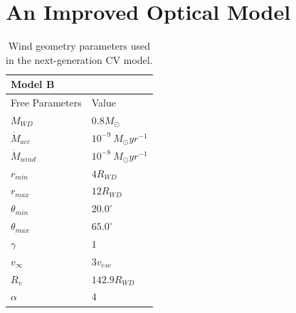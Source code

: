 \documentclass[preprint, a4paper, 11pt]{aastex}
\begin{document}
{%


%
%

\section{An Improved Optical Model }

\begin{table}
\centering
\begin{tabular}{p{3cm}p{4cm}}
Model B \\
\hline Free Parameters 	&	 Value \\ 
\hline \hline 
$M_{WD}$ 	 &	 $0.8 M_{\odot}$ \\ 
$\dot{M}_{acc}$ 	 &	 $10^{-9}~M_{\odot}yr^{-1}$\\ 
$\dot{M}_{wind}$  &	$10^{-8}~M_{\odot}yr^{-1}$\\ 
$r_{min}$ 	&	 $4 R_{WD}$\\ 
$r_{max}$ 	&	 $12 R_{WD}$ \\ 
$\theta_{min}$ 	&	 $20.0^{\circ}$ \\ 
$\theta_{max}$ 	&	 $65.0^{\circ}$ \\ 
$\gamma$ 	&	 $1$ \\ 
$v_{\infty}$ 	&	 $3v_{esc}$ \\ 
$R_v$ 	        &	 $142.9 R_{WD}$ \\ 
$\alpha$ 	&	 $4$ \\
\end{tabular}
\centering
\caption{Wind geometry parameters used in the next-generation CV model.}
\label{modelb}
\end{table}

}
\end{document}
